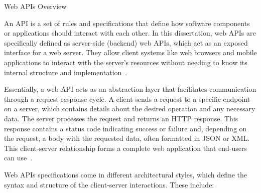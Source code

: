\documentclass[12pt, reqno]{amsbook}
\makeatletter
\def\section{\@startsection{section}{1}%
      \z@{.5\linespacing\@plus.7\linespacing}{.25\linespacing}%
      {\normalfont\bfseries\flushleft}}
\theoremstyle{definition}
\theoremstyle{definition}
\numberwithin{section}{chapter}
\numberwithin{table}{chapter}
\numberwithin{figure}{chapter}
\makeatother
\begin{document}
\section{Web \texorpdfstring{\acp{API}}{API} Overview}
\label{Section:Web_API_Overview}

An \ac{API} is a set of rules and specifications that define how software components or applications should interact with each other. In this dissertation, web \acp{API} are specifically defined as server-side (backend) web \acp{API}, which act as an exposed interface for a web server. They allow client systems like web browsers and mobile applications to interact with the server's resources without needing to know its internal structure and implementation~\cite{Jin2018,Neumann2021, Khozaimi2022}.

Essentially, a web \ac{API} acts as an abstraction layer that facilitates communication through a request-response cycle. A client sends a request to a specific endpoint on a server, which contains details about the desired operation and any necessary data. The server processes the request and returns an \ac{HTTP} response. This response contains a status code indicating success or failure and, depending on the request, a body with the requested data, often formatted in \ac{JSON} or \ac{XML}. This client-server relationship forms a complete web application that end-users can use~\cite{Jin2018,Neumann2021, Khozaimi2022}.

Web \acp{API} specifications come in different architectural styles, which define the syntax and structure of the client-server interactions. These include:
\end{document}
